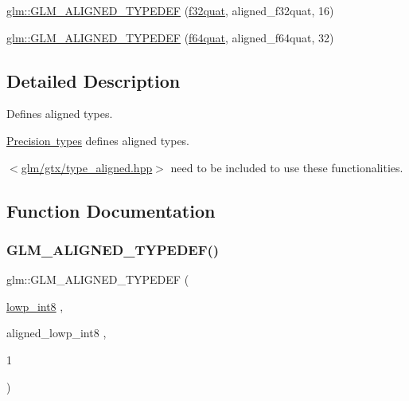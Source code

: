 \begin{DoxyCompactItemize}
\item 
\mbox{\hyperlink{group__gtx__type__aligned_ga1ed8aeb5ca67fade269a46105f1bf273}{glm\+::\+G\+L\+M\+\_\+\+A\+L\+I\+G\+N\+E\+D\+\_\+\+T\+Y\+P\+E\+D\+EF}} (\mbox{\hyperlink{group__gtc__type__precision_gac59c4d798396552e4bbb866b3d8a2f18}{f32quat}}, aligned\+\_\+f32quat, 16)
\item 
\mbox{\hyperlink{group__gtx__type__aligned_ga95cc03b8b475993fa50e05e38e203303}{glm\+::\+G\+L\+M\+\_\+\+A\+L\+I\+G\+N\+E\+D\+\_\+\+T\+Y\+P\+E\+D\+EF}} (\mbox{\hyperlink{group__gtc__type__precision_ga5b54d7b36fbee5e271f73e6ed74e7172}{f64quat}}, aligned\+\_\+f64quat, 32)
\end{DoxyCompactItemize}


\subsection{Detailed Description}
Defines aligned types. 

\mbox{\hyperlink{group__core__precision}{Precision types}} defines aligned types.

$<$\mbox{\hyperlink{gtx_2type__aligned_8hpp}{glm/gtx/type\+\_\+aligned.\+hpp}}$>$ need to be included to use these functionalities. 

\subsection{Function Documentation}
\mbox{\label{group__gtx__type__aligned_gab5cd5c5fad228b25c782084f1cc30114}} 
\subsubsection{\texorpdfstring{GLM\_ALIGNED\_TYPEDEF()}{GLM\_ALIGNED\_TYPEDEF()}\hspace{0.1cm}{\footnotesize\ttfamily [1/209]}}
{\footnotesize\ttfamily glm\+::\+G\+L\+M\+\_\+\+A\+L\+I\+G\+N\+E\+D\+\_\+\+T\+Y\+P\+E\+D\+EF (\begin{DoxyParamCaption}\item[{\mbox{\hyperlink{group__gtc__type__precision_gaf9e675b6392764242ae87eb179e9d3d6}{lowp\+\_\+int8}}}]{,  }\item[{aligned\+\_\+lowp\+\_\+int8}]{,  }\item[{1}]{ }\end{DoxyParamCaption})}

